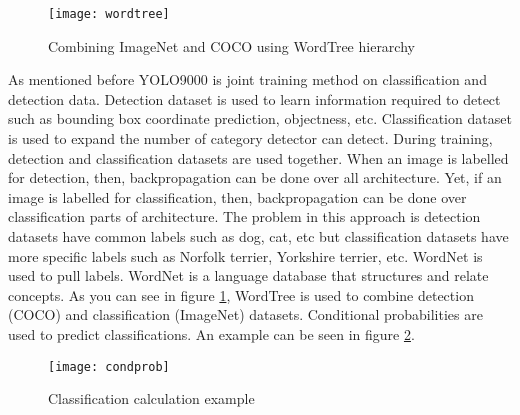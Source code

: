 \documentclass{article}
\begin{document}
\begin{enumerate}
    \begin{figure}
        \centering
        \texttt{[image: wordtree]}
        \caption{Combining ImageNet and COCO using WordTree hierarchy}
        \label{fig:wordtree1}
    \end{figure}
    
    As mentioned before YOLO9000 is joint training method on classification and detection 
    data. Detection dataset is used to learn information required to detect such as bounding 
    box coordinate prediction, objectness, etc. Classification dataset is used to expand the 
    number of category detector can detect. During training, detection and classification 
    datasets are used together. When an image is labelled for detection, then, backpropagation 
    can be done over all architecture. Yet, if an image is labelled for classification, then, 
    backpropagation can be done over classification parts of architecture. The problem in this 
    approach is detection datasets have common labels such as dog, cat, etc but classification 
    datasets have more specific labels such as Norfolk terrier, Yorkshire terrier, etc. 
    WordNet is used to pull labels. WordNet is a language database that structures and relate 
    concepts. As you can see in figure \ref{fig:wordtree1}, WordTree is used to combine 
    detection (COCO) and classification (ImageNet) datasets. Conditional probabilities are used 
    to predict classifications. An example can be seen in figure \ref{fig:condprob1}.
    
    \begin{figure}
        \centering
        \texttt{[image: condprob]}
        \caption{Classification calculation example}
        \label{fig:condprob1}
    \end{figure}
\end{enumerate}
\end{document}
